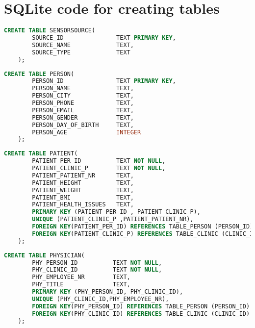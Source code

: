 
\chapter{SQLite code for creating tables} %
\label{AppendixD} %
\begin{lstlisting}[caption={SQLite code for creating table SensorSource}, label = {listing:SQLSensorSource},language=SQL]
    CREATE TABLE SENSORSOURCE(
	    SOURCE_ID               TEXT PRIMARY KEY,
	    SOURCE_NAME             TEXT,
	    SOURCE_TYPE             TEXT
	);
\end{lstlisting}
\begin{lstlisting}[caption={SQLite code for creating table Patient}, label = {listing:SQLPerson},language=SQL]
    CREATE TABLE PERSON(
	    PERSON_ID               TEXT PRIMARY KEY,
        PERSON_NAME             TEXT, 
        PERSON_CITY             TEXT, 
        PERSON_PHONE            TEXT, 
        PERSON_EMAIL            TEXT, 
        PERSON_GENDER           TEXT, 
        PERSON_DAY_OF_BIRTH     TEXT, 
        PERSON_AGE              INTEGER
    );
\end{lstlisting}
\begin{lstlisting}[caption={SQLite code for creating table Patient}, label = {listing:SQLPatient},language=SQL]
    CREATE TABLE PATIENT(
    	PATIENT_PER_ID          TEXT NOT NULL, 
        PATIENT_CLINIC_P        TEXT NOT NULL, 
        PATIENT_PATIENT_NR      TEXT, 
        PATIENT_HEIGHT          TEXT, 
        PATIENT_WEIGHT          TEXT, 
        PATIENT_BMI             TEXT, 
        PATIENT_HEALTH_ISSUES   TEXT, 
        PRIMARY KEY (PATIENT_PER_ID , PATIENT_CLINIC_P), 
        UNIQUE (PATIENT_CLINIC_P ,PATIENT_PATIENT_NR), 
        FOREIGN KEY(PATIENT_PER_ID) REFERENCES TABLE_PERSON (PERSON_ID) ON DELETE CASCADE,
        FOREIGN KEY(PATIENT_CLINIC_P) REFERENCES TABLE_CLINIC (CLINIC_ID) ON DELETE CASCADE 
    );
\end{lstlisting}
\begin{lstlisting}[caption={SQLite code for creating table Physician}, label = {listing:SQLPhysician},language=SQL]
    CREATE TABLE PHYSICIAN(
    	PHY_PERSON_ID          TEXT NOT NULL, 
        PHY_CLINIC_ID          TEXT NOT NULL, 
        PHY_EMPLOYEE_NR        TEXT, 
        PHY_TITLE              TEXT, 
        PRIMARY KEY (PHY_PERSON_ID, PHY_CLINIC_ID), 
        UNIQUE (PHY_CLINIC_ID,PHY_EMPLOYEE_NR), 
        FOREIGN KEY(PHY_PERSON_ID) REFERENCES TABLE_PERSON (PERSON_ID) ON DELETE CASCADE, 
        FOREIGN KEY(PHY_CLINIC_ID) REFERENCES TABLE_CLINIC (CLINIC_ID) ON DELETE CASCADE 
    );
\end{lstlisting}
